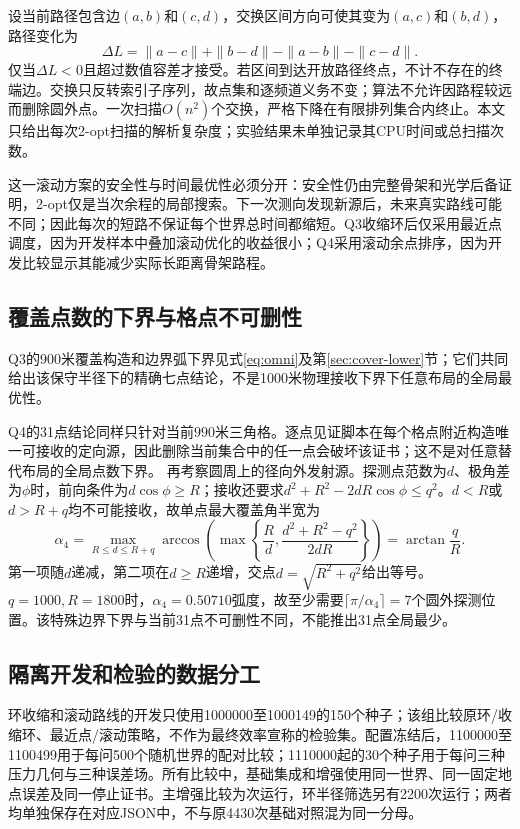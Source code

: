设当前路径包含边$(a,b)$和$(c,d)$，交换区间方向可使其变为$(a,c)$和$(b,d)$，路径变化为
\begin{equation}\label{eq:two-opt-delta}
 \Delta L=\|a-c\|+\|b-d\|-\|a-b\|-\|c-d\|.
\end{equation}
仅当$\Delta L<0$且超过数值容差才接受。若区间到达开放路径终点，不计不存在的终端边。交换只反转索引子序列，故点集和逐频道义务不变；算法不允许因路程较远而删除圆外点。一次扫描$O(n^2)$个交换，严格下降在有限排列集合内终止。本文只给出每次2-opt扫描的解析复杂度；实验结果未单独记录其CPU时间或总扫描次数。

这一滚动方案的安全性与时间最优性必须分开：安全性仍由完整骨架和光学后备证明，2-opt仅是当次余程的局部搜索。下一次测向发现新源后，未来真实路线可能不同；因此每次的短路不保证每个世界总时间都缩短。Q3收缩环后仅采用最近点调度，因为开发样本中叠加滚动优化的收益很小；Q4采用滚动余点排序，因为开发比较显示其能减少实际长距离骨架路程。
\subsection{覆盖点数的下界与格点不可删性}
\begingroup\sloppy
Q3的900米覆盖构造和边界弧下界见式\eqref{eq:omni}及第\ref{sec:cover-lower}节；它们共同给出该保守半径下的精确七点结论，不是1000米物理接收下界下任意布局的全局最优性。

Q4的31点结论同样只针对当前$990$米三角格。逐点见证脚本在每个格点附近构造唯一可接收的定向源，因此删除当前集合中的任一点会破坏该证书；这不是对任意替代布局的全局点数下界。
再考察圆周上的径向外发射源。探测点范数为$d$、极角差为$\phi$时，前向条件为$d\cos\phi\ge R$；接收还要求$d^2+R^2-2dR\cos\phi\le q^2$。$d<R$或$d>R+q$均不可能接收，故单点最大覆盖角半宽为
\begin{equation}\label{eq:boundary-angle-bound}
\alpha_4=\max_{R\le d\le R+q}\arccos\!\left(\max\left\{\frac R d,\frac{d^2+R^2-q^2}{2dR}\right\}\right)=\arctan\frac qR.
\end{equation}
第一项随$d$递减，第二项在$d\ge R$递增，交点$d=\sqrt{R^2+q^2}$给出等号。$q=1000,R=1800$时，$\alpha_4=0.50710$弧度，故至少需要$\lceil\pi/\alpha_4\rceil=7$个圆外探测位置。该特殊边界下界与当前31点不可删性不同，不能推出31点全局最少。
\begin{table}[H]\centering\small
\caption{覆盖下界及当前固定集合的不可删性证据}\label{tab:coverage-limits}

\end{table}
\endgroup

\subsection{隔离开发和检验的数据分工}
环收缩和滚动路线的开发只使用1000000至1000149的150个种子；该组比较原环/收缩环、最近点/滚动策略，不作为最终效率宣称的检验集。配置冻结后，1100000至1100499用于每问500个随机世界的配对比较；1110000起的30个种子用于每问三种压力几何与三种误差场。所有比较中，基础集成和增强使用同一世界、同一固定地点误差及同一停止证书。主增强比较为\EnhancementRuns{}次运行，环半径筛选另有2200次运行；两者均单独保存在对应JSON中，不与原4430次基础对照混为同一分母。

